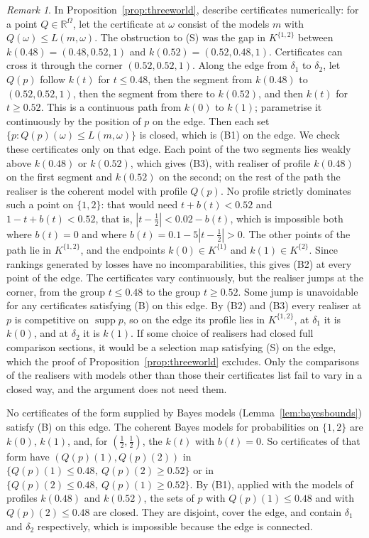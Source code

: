\documentclass[11pt]{article}
\theoremstyle{definition}
\theoremstyle{remark}
\newtheorem{remark}[theorem]{Remark}
\newcommand{\R}{\mathbb R}
\newcommand{\supp}{\operatorname{supp}}
\begin{document}
\begin{remark}\label{rem:threeworld-bounds}
In Proposition~\ref{prop:threeworld}, describe certificates numerically: for a point $Q\in\R^\Omega$, let the certificate at $\omega$ consist of the models $m$ with $Q(\omega)\le L(m,\omega)$. The obstruction to (S) was the gap in $K^{\{1,2\}}$ between $k(0.48)=(0.48,0.52,1)$ and $k(0.52)=(0.52,0.48,1)$. Certificates can cross it through the corner $(0.52,0.52,1)$. Along the edge from $\delta_1$ to $\delta_2$, let $Q(p)$ follow $k(t)$ for $t\le0.48$, then the segment from $k(0.48)$ to $(0.52,0.52,1)$, then the segment from there to $k(0.52)$, and then $k(t)$ for $t\ge0.52$. This is a continuous path from $k(0)$ to $k(1)$; parametrise it continuously by the position of $p$ on the edge. Then each set $\{p:Q(p)(\omega)\le L(m,\omega)\}$ is closed, which is (B1) on the edge. We check these certificates only on that edge. Each point of the two segments lies weakly above $k(0.48)$ or $k(0.52)$, which gives (B3), with realiser of profile $k(0.48)$ on the first segment and $k(0.52)$ on the second; on the rest of the path the realiser is the coherent model with profile $Q(p)$. No profile strictly dominates such a point on $\{1,2\}$: that would need $t+b(t)<0.52$ and $1-t+b(t)<0.52$, that is, $|t-\tfrac12|<0.02-b(t)$, which is impossible both where $b(t)=0$ and where $b(t)=0.1-5|t-\tfrac12|>0$. The other points of the path lie in $K^{\{1,2\}}$, and the endpoints $k(0)\in K^{\{1\}}$ and $k(1)\in K^{\{2\}}$. Since rankings generated by losses have no incomparabilities, this gives (B2) at every point of the edge. The certificates vary continuously, but the realiser jumps at the corner, from the group $t\le0.48$ to the group $t\ge0.52$. Some jump is unavoidable for any certificates satisfying (B) on this edge. By (B2) and (B3) every realiser at $p$ is competitive on $\supp p$, so on the edge its profile lies in $K^{\{1,2\}}$, at $\delta_1$ it is $k(0)$, and at $\delta_2$ it is $k(1)$. If some choice of realisers had closed full comparison sections, it would be a selection map satisfying (S) on the edge, which the proof of Proposition~\ref{prop:threeworld} excludes. Only the comparisons of the realisers with models other than those their certificates list fail to vary in a closed way, and the argument does not need them.

No certificates of the form supplied by Bayes models (Lemma~\ref{lem:bayesbounds}) satisfy (B) on this edge. The coherent Bayes models for probabilities on $\{1,2\}$ are $k(0)$, $k(1)$, and, for $(\tfrac12,\tfrac12)$, the $k(t)$ with $b(t)=0$. So certificates of that form have $(Q(p)(1),Q(p)(2))$ in $\{Q(p)(1)\le0.48,\ Q(p)(2)\ge0.52\}$ or in $\{Q(p)(2)\le0.48,\ Q(p)(1)\ge0.52\}$. By (B1), applied with the models of profiles $k(0.48)$ and $k(0.52)$, the sets of $p$ with $Q(p)(1)\le0.48$ and with $Q(p)(2)\le0.48$ are closed. They are disjoint, cover the edge, and contain $\delta_1$ and $\delta_2$ respectively, which is impossible because the edge is connected.
\end{remark}
\end{document}
